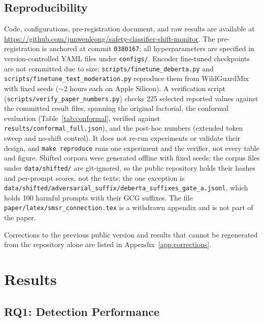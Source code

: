 \documentclass{article}
\begin{document}
\subsection{Reproducibility}
\label{sec:reproducibility}

Code, configurations, pre-registration document, and raw results are available at \url{https://github.com/junwenleong/safety-classifier-shift-monitor}. The pre-registration is anchored at commit \texttt{0380167}; all hyperparameters are specified in version-controlled YAML files under \texttt{configs/}. Encoder fine-tuned checkpoints are not committed due to size; \texttt{scripts/finetune\_deberta.py} and \texttt{scripts/finetune\_text\_moderation.py} reproduce them from WildGuardMix with fixed seeds (${\sim}$2 hours each on Apple Silicon). A verification script (\texttt{scripts/verify\_paper\_numbers.py}) checks 225 selected reported values against the committed result files, spanning the original factorial, the conformal evaluation (Table~\ref{tab:conformal}, verified against \texttt{results/conformal\_full.json}), and the post-hoc numbers (extended token sweep and no-shift control). It does not re-run experiments or validate their design, and \texttt{make reproduce} runs one experiment and the verifier, not every table and figure. Shifted corpora were generated offline with fixed seeds; the corpus files under \texttt{data/shifted/} are git-ignored, so the public repository holds their hashes and per-prompt scores, not the texts; the one exception is \texttt{data/shifted/adversarial\_suffix/deberta\_suffixes\_gate\_a.jsonl}, which holds 100 harmful prompts with their GCG suffixes. The file \texttt{paper/latex/smsr\_connection.tex} is a withdrawn appendix and is not part of the paper.

Corrections to the previous public version and results that cannot be regenerated from the repository alone are listed in Appendix~\ref{app:corrections}.

\section{Results}
\label{sec:results}

\subsection{RQ1: Detection Performance}
\label{sec:detection}
\end{document}
